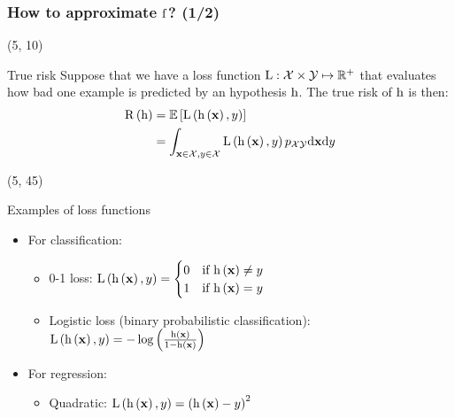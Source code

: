 \begin{frame}
  \frametitle{How to approximate $\mathrm{f}$? (1/2)}

  \begin{textblock}{90}(5, 10)
    \begin{block}{True risk}
      Suppose that we have a loss function $\mathrm{L}: \mathcal{X} \times \mathcal{Y} \mapsto
      \mathbb{R}^+$ that evaluates how bad one example is predicted by an hypothesis $\mathrm{h}$.
      The true risk of $\mathrm{h}$ is then:
      \begin{equation}
        \begin{split}
          \mathrm{R} \left ( {\mathrm{h}} \right ) & = \mathrm{\mathbb{E}} \left [ {\mathrm{L} \left ( {\mathrm{h} \left ( {\mathbf{x}} \right ), y} \right )} \right ]\\
                              & = \int_{\mathbf{x} \in \mathcal{X}, y \in \mathcal{X}}
          \mathrm{L} \left ( {\mathrm{h} \left ( {\mathbf{x}} \right ), y} \right ) p_{\mathcal{X} \mathcal{Y}} \mathrm{d} \mathbf{x} \mathrm{d} y
        \end{split}
      \end{equation}
    \end{block}
\end{textblock}

  \begin{textblock}{90}(5, 45)
    \begin{block}{Examples of loss functions}
      \begin{itemize}
      \item For classification:
        \begin{itemize}
        \item 0-1 loss:
          $\mathrm{L} \left ( {\mathrm{h} \left ( {\mathbf{x}} \right ), y} \right ) =
          \begin{cases}
            0 & \text{if $\mathrm{h} \left ( {\mathbf{x}} \right ) \ne y$} \\
            1 & \text{if $\mathrm{h} \left ( {\mathbf{x}} \right )  =  y$}
          \end{cases}
          $
        \item Logistic loss (binary probabilistic classification): $\mathrm{L} \left ( {\mathrm{h} \left ( {\mathbf{x}} \right ),
            y} \right ) = -\log \left ( {\frac{\mathrm{h} \left ( {\mathbf{x}} \right )}{1-\mathrm{h} \left ( {\mathbf{x}} \right )}} \right )$
        \end{itemize}
      \item For regression:
        \begin{itemize}
        \item Quadratic: $\mathrm{L} \left ( {\mathrm{h} \left ( {\mathbf{x}} \right ), y} \right )
          = \left( \mathrm{h} \left ( {\mathbf{x}} \right ) - y \right)^2$
        \end{itemize}
      \end{itemize}
    \end{block}
  \end{textblock}
\end{frame}


